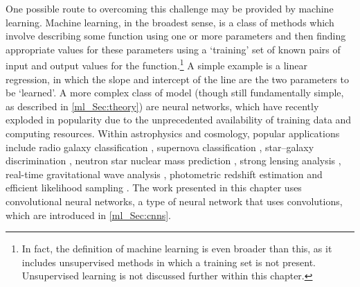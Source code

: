 One possible route to overcoming this challenge may be provided by machine learning. Machine learning, in the broadest sense, is a class of methods which involve describing some function using one or more parameters and then finding appropriate values for these parameters using a `training' set of known pairs of input and output values for the function.\footnote{In fact, the definition of machine learning is even broader than this, as it includes unsupervised methods in which a training set is not present. Unsupervised learning is not discussed further within this chapter.}
A simple example is a linear regression, in which the slope and intercept of the line are the two parameters to be `learned'. A more complex class of model (though still fundamentally simple, as described in \autoref{ml_Sec:theory}) are neural networks, which have recently exploded in popularity due to the unprecedented availability of training data and computing resources. Within astrophysics and cosmology, popular applications include radio galaxy classification \citep{Aniyan2017, Scaife2021, Mohan2022}, supernova classification \citep{Charnock2017, Moller2020}, star--galaxy discrimination \citep{Kim2017}, neutron star nuclear mass prediction \citep{Utama2016, Niu2018}, strong lensing analysis \citep{Hezaveh2017, Petrillo2017, PerreaultLevasseur2017, Jacobs2017}, real-time gravitational wave analysis \citep{George2018}, photometric redshift estimation \citep{Bonnett2015, Hoyle2016, Pasquet2019} and efficient likelihood sampling \citep{Manrique-Yus2020}. The work presented in this chapter uses convolutional neural networks, a type of neural network that uses convolutions, which are introduced in \autoref{ml_Sec:cnns}.

